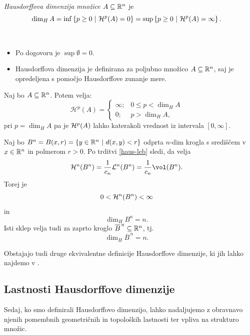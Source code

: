 \begin{definicija}
    \emph{Hausdorffova dimenzija množice \(A \subseteq \mathbb{R}^n\)} je 
    \[\dim_H A = \inf \left\{p \geq 0 \ | \ \mathcal{H}^{p}(A) = 0\right\} = \sup \left\{p \geq 0 \ | \ \mathcal{H}^{p}(A) = \infty\right\}.\]
\end{definicija}

\begin{opomba} \ 
    \begin{itemize}
        \item Po dogovoru je \(\sup \emptyset = 0\).
        \item Hausdorffova dimenzija je definirana za poljubno množico \(A \subseteq \mathbb{R}^n\), saj je opredeljena s pomočjo Hausdorffove zunanje mere.
    \end{itemize}    
\end{opomba}

\begin{opomba}
    Naj bo \(A \subseteq \mathbb{R}^n\). Potem velja:
        \[
            \mathcal{H}^{p}(A) = \begin{cases}
                \infty; &0 \leq p < \dim_H A \\ 
                0; &p > \dim_H A,
            \end{cases}
        \]        
        pri \(p = \dim_H A\) pa je \(\mathcal{H}^p(A)\) lahko katerakoli vrednost iz intervala \([0, \infty]\).
\end{opomba}

\begin{zgled}
    \label{dim-ball}
    Naj bo \(B^n = B(x, r) = \left\{y \in \mathbb{R}^n \ | \ d(x, y) < r\right\}\) odprta \(n\)-dim krogla s središčem v \(x \in \mathbb{R}^n\) in polmerom \(r > 0\). Po trditvi \ref{haus-leb} sledi, da velja
    \[\mc{H}^n(B^n) = \frac{1}{c_n} \mc{L}^n(B^n) = \frac{1}{c_n} \vol(B^n).\]
    Torej je 
    \[0 < \mathcal{H}^n(B^n) < \infty\]
    in 
    \[\dim_H B^n = n.\]
    Isti sklep velja tudi za zaprto kroglo \(\overline{B}^{\, n} \subseteq \mathbb{R}^n\), tj.
    \[\dim_H \overline{B}^{\, n} = n.\]
\end{zgled}

\begin{opomba}
    Obstajajo tudi druge ekvivalentne definicije Hausdorffove dimenzije, ki jih lahko najdemo v \cite{fk-fg}.
\end{opomba}

\subsection{Lastnosti Hausdorffove dimenzije}
Sedaj, ko smo definirali Hausdorffovo dimenzijo, lahko nadaljujemo z obravnavo njenih pomembnih geometričnih in topoloških lastnosti ter vpliva na strukturo množic.

